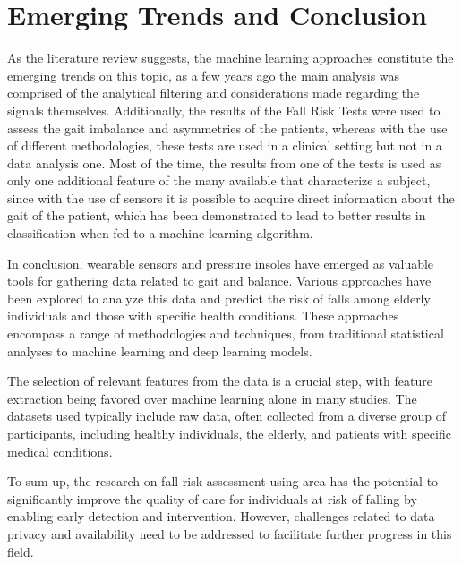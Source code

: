 \section{Emerging Trends and Conclusion}

As the literature review suggests, the machine learning approaches constitute the emerging trends on this topic, as a few years ago the main analysis was comprised of the analytical filtering and considerations made regarding the signals themselves. 
Additionally, the results of the Fall Risk Tests were used to assess the gait imbalance and asymmetries of the patients, whereas with the use of different methodologies, these tests are used in a clinical setting but not in a data analysis one.
Most of the time, the results from one of the tests is used as only one additional feature of the many available that characterize a subject, since with the use of sensors it is possible to acquire direct information about the gait of the patient, which has been demonstrated to lead to better results in classification when fed to a machine learning algorithm.

In conclusion, wearable sensors and pressure insoles have emerged as valuable tools for gathering data related to gait and balance. Various approaches have been explored to analyze this data and predict the risk of falls among elderly individuals and those with specific health conditions. These approaches encompass a range of methodologies and techniques, from traditional statistical analyses to machine learning and deep learning models.

The selection of relevant features from the data is a crucial step, with feature extraction being favored over machine learning alone in many studies. 
The datasets used typically include raw data, often collected from a diverse group of participants, including healthy individuals, the elderly, and patients with specific medical conditions.

To sum up, the research on fall risk assessment using area has the potential to significantly improve the quality of care for individuals at risk of falling by enabling early detection and intervention. However, challenges related to data privacy and availability need to be addressed to facilitate further progress in this field. 